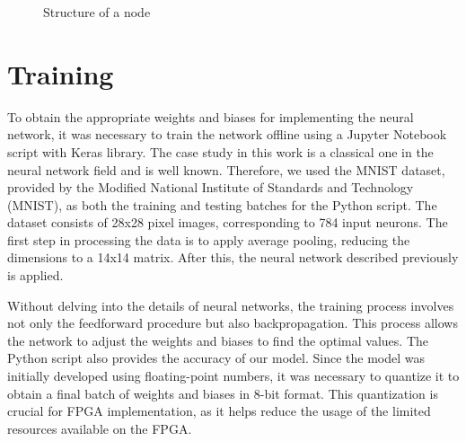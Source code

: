 \documentclass[11pt]{report}
\begin{document}
\begin{figure}[!ht]
\centering
{}
\caption{Structure of a node}
\label{fig:node}
\end{figure}

\section{Training}
\label{sec:training}

To obtain the appropriate weights and biases for implementing the neural network, it was necessary to train the network offline using a Jupyter Notebook script with Keras library. The case study in this work is a classical one in the neural network field and is well known. Therefore, we used the MNIST dataset, provided by the Modified National Institute of Standards and Technology (MNIST), as both the training and testing batches for the Python script. The dataset consists of 28x28 pixel images, corresponding to 784 input neurons. The first step in processing the data is to apply average pooling, reducing the dimensions to a 14x14 matrix. After this, the neural network described previously is applied.

Without delving into the details of neural networks, the training process involves not only the feedforward procedure but also backpropagation. This process allows the network to adjust the weights and biases to find the optimal values. The Python script also provides the accuracy of our model. Since the model was initially developed using floating-point numbers, it was necessary to quantize it to obtain a final batch of weights and biases in 8-bit format. This quantization is crucial for FPGA implementation, as it helps reduce the usage of the limited resources available on the FPGA.
\end{document}
